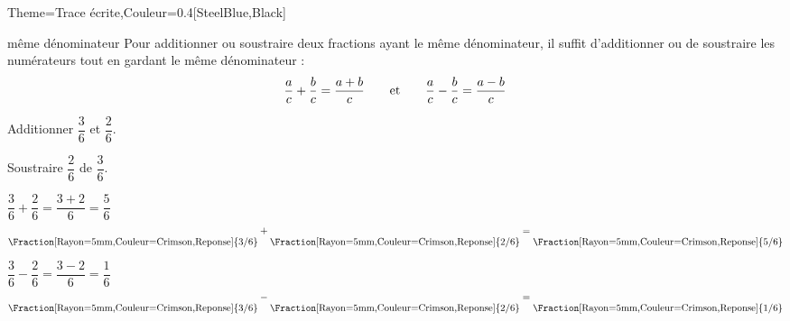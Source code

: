 \begin{Maquette}[Cours]{Theme={Trace écrite},Couleur={0.4[SteelBlue,Black]}}
      \begin{methode*}{même dénominateur}
         Pour additionner ou soustraire deux fractions ayant le même dénominateur, il suffit d'additionner ou de soustraire les numérateurs tout en gardant le même dénominateur :
         $${a\over c}+{b\over c}={a+b\over c} \qquad \text{et} \qquad {a\over c}-{b\over c}={a-b\over c}$$ \vspace*{-12mm}
         \begin{exbmethode}
            \begin{multicols}{2}
               Additionner $\dfrac36$ et $\dfrac26$.  \par
               Soustraire $\dfrac26$ de $\dfrac36$.
            \end{multicols}
            \tcblower
               \begin{multicols}{2}
                  $\dfrac36+\dfrac26 =\dfrac{3+2}{6} =\dfrac56$
                  \quad $\raisebox{-4mm}{\Fraction[Rayon=5mm,Couleur=Crimson,Reponse]{3/6}} + \raisebox{-4mm}{\Fraction[Rayon=5mm,Couleur=Crimson,Reponse]{2/6}} = \raisebox{-4mm}{\Fraction[Rayon=5mm,Couleur=Crimson,Reponse]{5/6}}$ \par
                  $\dfrac36-\dfrac26 =\dfrac{3-2}{6} =\dfrac16$
                  \quad $\raisebox{-4mm}{\Fraction[Rayon=5mm,Couleur=Crimson,Reponse]{3/6}} - \raisebox{-4mm}{\Fraction[Rayon=5mm,Couleur=Crimson,Reponse]{2/6}} = \raisebox{-4mm}{\Fraction[Rayon=5mm,Couleur=Crimson,Reponse]{1/6}}$
               \end{multicols}
        \end{exbmethode}
      \end{methode*}

      \smallskip


\end{Maquette}
